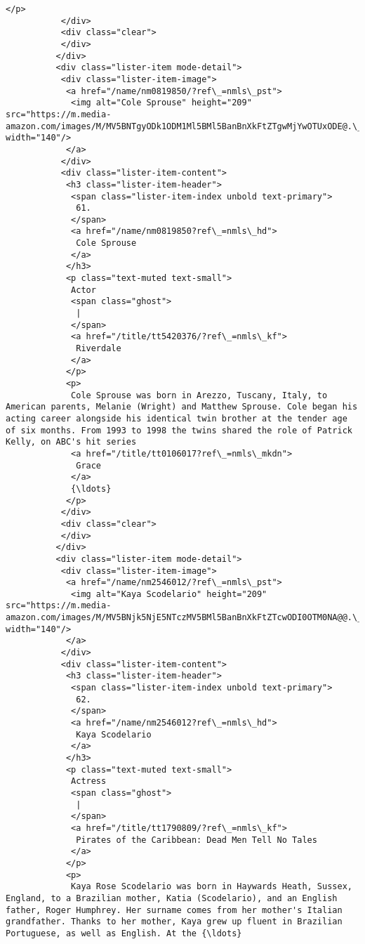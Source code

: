 \documentclass[11pt]{article}
\begin{document}
\begin{Verbatim}[commandchars=\\\{\}]
            </p>
           </div>
           <div class="clear">
           </div>
          </div>
          <div class="lister-item mode-detail">
           <div class="lister-item-image">
            <a href="/name/nm0819850/?ref\_=nmls\_pst">
             <img alt="Cole Sprouse" height="209" src="https://m.media-amazon.com/images/M/MV5BNTgyODk1ODM1Ml5BMl5BanBnXkFtZTgwMjYwOTUxODE@.\_V1\_UY209\_CR8,0,140,209\_AL\_.jpg" width="140"/>
            </a>
           </div>
           <div class="lister-item-content">
            <h3 class="lister-item-header">
             <span class="lister-item-index unbold text-primary">
              61.
             </span>
             <a href="/name/nm0819850?ref\_=nmls\_hd">
              Cole Sprouse
             </a>
            </h3>
            <p class="text-muted text-small">
             Actor
             <span class="ghost">
              |
             </span>
             <a href="/title/tt5420376/?ref\_=nmls\_kf">
              Riverdale
             </a>
            </p>
            <p>
             Cole Sprouse was born in Arezzo, Tuscany, Italy, to American parents, Melanie (Wright) and Matthew Sprouse. Cole began his acting career alongside his identical twin brother at the tender age of six months. From 1993 to 1998 the twins shared the role of Patrick Kelly, on ABC's hit series
             <a href="/title/tt0106017?ref\_=nmls\_mkdn">
              Grace
             </a>
             {\ldots}
            </p>
           </div>
           <div class="clear">
           </div>
          </div>
          <div class="lister-item mode-detail">
           <div class="lister-item-image">
            <a href="/name/nm2546012/?ref\_=nmls\_pst">
             <img alt="Kaya Scodelario" height="209" src="https://m.media-amazon.com/images/M/MV5BNjk5NjE5NTczMV5BMl5BanBnXkFtZTcwODI0OTM0NA@@.\_V1\_UY209\_CR3,0,140,209\_AL\_.jpg" width="140"/>
            </a>
           </div>
           <div class="lister-item-content">
            <h3 class="lister-item-header">
             <span class="lister-item-index unbold text-primary">
              62.
             </span>
             <a href="/name/nm2546012?ref\_=nmls\_hd">
              Kaya Scodelario
             </a>
            </h3>
            <p class="text-muted text-small">
             Actress
             <span class="ghost">
              |
             </span>
             <a href="/title/tt1790809/?ref\_=nmls\_kf">
              Pirates of the Caribbean: Dead Men Tell No Tales
             </a>
            </p>
            <p>
             Kaya Rose Scodelario was born in Haywards Heath, Sussex, England, to a Brazilian mother, Katia (Scodelario), and an English father, Roger Humphrey. Her surname comes from her mother's Italian grandfather. Thanks to her mother, Kaya grew up fluent in Brazilian Portuguese, as well as English. At the {\ldots}

\end{Verbatim}
\end{document}
